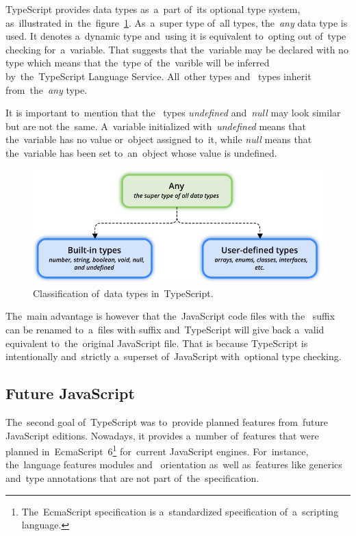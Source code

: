 TypeScript provides data types as~a~part of~its optional type system, as~illustrated in~the~figure~\ref{fig-datatypes}. As~a~super
type of~all types, the~\textit{any} data type is used. It denotes a~dynamic type
and~using it is equivalent to~opting out of~type checking for~a~variable. That
suggests that the~variable may be declared with no type which means that
the~type of~the~varible will be inferred by~the~TypeScript Language Service.
All~other  types and~ types inherit
from~the~\textit{any} type.

It is important to~mention that the~ types \textit{undefined}
and~\textit{null} may look similar but are not the~same. A~variable initialized
with~\textit{undefined} means that the~variable has no value or~object assigned
to~it, while \textit{null} means that the~variable has been set to~an~object
whose value is undefined.

\begin{figure}[!hbt]
	\centering
	\includegraphics[scale=0.8]{./figures/data-types.pdf}
	\caption{Classification of~data types in~TypeScript.}
	\label{fig-datatypes}
\end{figure}

The~main advantage is however that the~JavaScript code files with the~
suffix can be renamed to~a~files with  suffix and~TypeScript will give
back a~valid equivalent to~the~original JavaScript file. That is because
TypeScript is intentionally and~strictly a~superset of~JavaScript with~optional
type checking.


\subsection{Future JavaScript}
The~second goal of~TypeScript was to~provide planned features from~future
JavaScript editions. Nowadays, it provides a~number of~features that were planned
in~EcmaScript~6\footnote{The~EcmaScript specification is a~standardized
specification of~a~scripting language.} for~current JavaScript engines.
For~instance, the~language features modules and~ orientation
as~well as~features like generics and~type annotations that are not part
of~the~specification.

